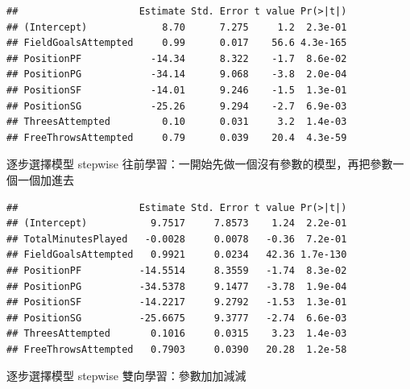 \documentclass[
]{book}
\newenvironment{Shaded}{\begin{snugshade}}{\end{snugshade}}
\newcommand{\CommentTok}[1]{\textcolor[rgb]{0.56,0.35,0.01}{\textit{#1}}}
\newcommand{\DataTypeTok}[1]{\textcolor[rgb]{0.13,0.29,0.53}{#1}}
\newcommand{\KeywordTok}[1]{\textcolor[rgb]{0.13,0.29,0.53}{\textbf{#1}}}
\newcommand{\NormalTok}[1]{#1}
\newcommand{\OperatorTok}[1]{\textcolor[rgb]{0.81,0.36,0.00}{\textbf{#1}}}
\newcommand{\OtherTok}[1]{\textcolor[rgb]{0.56,0.35,0.01}{#1}}
\newcommand{\StringTok}[1]{\textcolor[rgb]{0.31,0.60,0.02}{#1}}
\begin{document}
\begin{verbatim}
##                     Estimate Std. Error t value Pr(>|t|)
## (Intercept)             8.70      7.275     1.2  2.3e-01
## FieldGoalsAttempted     0.99      0.017    56.6 4.3e-165
## PositionPF            -14.34      8.322    -1.7  8.6e-02
## PositionPG            -34.14      9.068    -3.8  2.0e-04
## PositionSF            -14.01      9.246    -1.5  1.3e-01
## PositionSG            -25.26      9.294    -2.7  6.9e-03
## ThreesAttempted         0.10      0.031     3.2  1.4e-03
## FreeThrowsAttempted     0.79      0.039    20.4  4.3e-59
\end{verbatim}

逐步選擇模型 stepwise 往前學習：一開始先做一個沒有參數的模型，再把參數一個一個加進去

\begin{Shaded}
\end{Shaded}

\begin{verbatim}
##                     Estimate Std. Error t value Pr(>|t|)
## (Intercept)           9.7517     7.8573    1.24  2.2e-01
## TotalMinutesPlayed   -0.0028     0.0078   -0.36  7.2e-01
## FieldGoalsAttempted   0.9921     0.0234   42.36 1.7e-130
## PositionPF          -14.5514     8.3559   -1.74  8.3e-02
## PositionPG          -34.5378     9.1477   -3.78  1.9e-04
## PositionSF          -14.2217     9.2792   -1.53  1.3e-01
## PositionSG          -25.6675     9.3777   -2.74  6.6e-03
## ThreesAttempted       0.1016     0.0315    3.23  1.4e-03
## FreeThrowsAttempted   0.7903     0.0390   20.28  1.2e-58
\end{verbatim}

逐步選擇模型 stepwise 雙向學習：參數加加減減

\begin{Shaded}
\end{Shaded}
\end{document}
